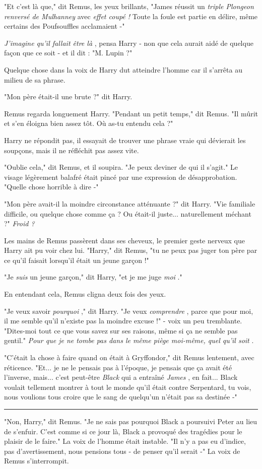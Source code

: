 "Et c'est là que," dit Remus, les yeux brillants, "James réussit un \emph{triple Plongeon renversé de Mulhanney } avec \emph{effet coupé !}  Toute la foule est partie en délire, même certains des Poufsouffles acclamaient -"

\emph{J'imagine qu'il fallait être là} , pensa Harry - non que cela aurait aidé de quelque façon que ce soit - et il dit : "M. Lupin ?"

Quelque chose dans la voix de Harry dut atteindre l'homme car il s'arrêta au milieu de sa phrase.

"Mon père était-il une brute ?" dit Harry.

Remus regarda longuement Harry. "Pendant un petit temps," dit Remus. "Il mûrit et s'en éloigna bien assez tôt. Où as-tu entendu cela ?"

Harry ne répondit pas, il essayait de trouver une phrase vraie qui dévierait les soupçons, mais il ne réfléchit pas assez vite.

"Oublie cela," dit Remus, et il soupira. "Je peux deviner de qui il s'agit." Le visage légèrement balafré était pincé par une expression de désapprobation. "Quelle chose horrible à dire -"

"Mon père avait-il la moindre circonstance atténuante ?" dit Harry. "Vie familiale difficile, ou quelque chose comme ça ? Ou était-il juste... naturellement méchant ?" \emph{Froid ?} 

Les mains de Remus passèrent dans ses cheveux, le premier geste nerveux que Harry ait pu voir chez lui. "Harry," dit Remus, "tu ne peux pas juger ton père par ce qu'il faisait lorsqu'il était un jeune garçon !"

"Je\emph{ suis}  un jeune garçon," dit Harry, "et je me juge \emph{moi} ."

En entendant cela, Remus cligna deux fois des yeux.

"Je veux savoir \emph{pourquoi} ," dit Harry. "Je veux \emph{comprendre} , parce que pour moi, il me semble qu'il n'existe pas la moindre excuse !" - voix un peu tremblante. "Dites-moi tout ce que vous savez sur ses raisons, même si ça ne semble pas gentil." \emph{Pour que je ne tombe pas dans le même piège moi-même, quel qu'il soit} .

"C'était la chose à faire quand on était à Gryffondor," dit Remus lentement, avec réticence. "Et... je ne le pensais pas à l'époque, je pensais que ça avait été l'inverse, mais... c'est peut-être \emph{Black}  qui a entraîné \emph{James} , en fait... Black voulait tellement montrer à tout le monde qu'il était contre Serpentard, tu vois, nous voulions tous croire que le sang de quelqu'un n'était pas sa destinée -"
\par\noindent\rule{\textwidth}{0.4pt}
"Non, Harry," dit Remus. "Je ne sais pas pourquoi Black a poursuivi Peter au lieu de s'enfuir. C'est comme si ce jour là, Black a provoqué des tragédies pour le plaisir de le faire." La voix de l'homme était instable. "Il n'y a pas eu d'indice, pas d'avertissement, nous pensions tous - de penser qu'il serait -" La voix de Remus s'interrompit.

